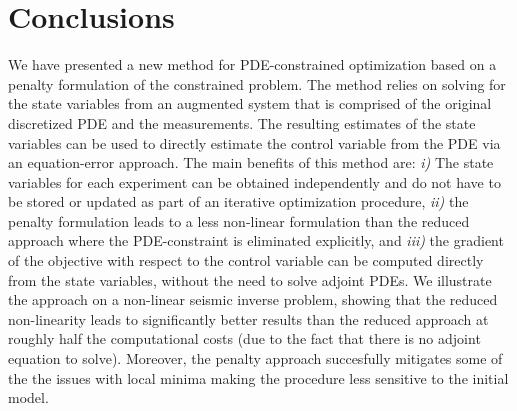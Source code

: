 \documentclass{iopart}
\begin{document}
\begin{description}
%
%
%
%

\end{description}

\section{Conclusions}
\label{conclusion}
We have presented a new method for PDE-constrained optimization based on
a penalty formulation of the constrained problem. The method
relies on solving for the state variables from an augmented system that
is comprised of the original discretized PDE and the measurements. The
resulting estimates of the state variables can be used to directly
estimate the control variable from the PDE via an equation-error
approach. The main benefits of this method are: \emph{i)} The state
variables for each experiment can be obtained independently and do not
have to be stored or updated as part of an iterative optimization
procedure, \emph{ii)} the penalty formulation leads to a less non-linear
formulation than the reduced approach where the PDE-constraint is
eliminated explicitly, and \emph{iii)} the gradient of the objective
with respect to the control variable can be computed directly from the
state variables, without the need to solve adjoint PDEs. We illustrate
the approach on a non-linear seismic inverse problem, showing that the
reduced non-linearity leads to significantly better results than the
reduced approach at roughly half the computational costs (due to the
fact that there is no adjoint equation to solve). Moreover, the penalty
approach succesfully mitigates some of the the issues with local minima
making the procedure less sensitive to the initial model.
\end{document}
